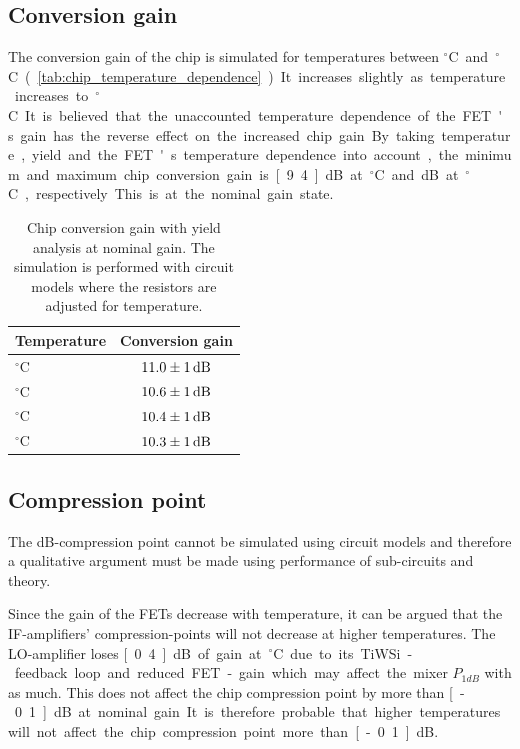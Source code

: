 		\subsection{Conversion gain}
			The conversion gain of the chip is simulated for temperatures between \unit[-40]{$^\circ$C} and \unit[85]{$^\circ$C} (\autoref{tab:chip_temperature_dependence}). It increases slightly as temperature increases to \unit[85]{$^\circ$C}. It is believed that the unaccounted temperature dependence of the FET's gain has the reverse effect on the increased chip gain.
			
			By taking temperature, yield and the FET's temperature dependence into account, the minimum and maximum chip conversion gain is \unit[9.4]{dB} at \unit[55]{$^\circ$C} and \unit[12]{dB} at \unit[-40]{$^\circ$C}, respectively. This is at the nominal gain state.

			\begin{table}[h!]
				\caption[Chip conversion gain temperature dependence]{Chip conversion gain with yield analysis at nominal gain. The simulation is performed with circuit models where the resistors are adjusted for temperature.}
				\label{tab:chip_temperature_dependence}
				\centering
				\begin{tabular}{ l c } \toprule %
					Temperature & Conversion gain \\\midrule
					\unit[-40]{$^\circ$C} 	& $\unit[11.0\pm1]{dB}$\\
					\unit[20]{$^\circ$C} 	& $\unit[10.6\pm1]{dB}$\\
					\unit[55]{$^\circ$C} 	& $\unit[10.4\pm1]{dB}$ \\
					\unit[85]{$^\circ$C}	& $\unit[10.3\pm1]{dB}$ \\\bottomrule
				\end{tabular}
			\end{table}			
	

		\subsection{Compression point}
			The \unit[1]{dB}-compression point cannot be simulated using circuit models and therefore a qualitative argument must be made using performance of sub-circuits and theory.
		
			Since the gain of the FETs decrease with temperature, it can be argued that the IF-amplifiers' compression-points will not decrease at higher temperatures. The LO-amplifier loses \unit[0.4]{dB} of gain at \unit[55]{$^\circ$C} due to its TiWSi-feedback loop and reduced FET-gain which may affect the mixer $P_{1dB}$ with as much. This does not affect the chip compression point by more than \unit[-0.1]{dB} at nominal gain. It is therefore probable that higher temperatures will not affect the chip compression point more than \unit[-0.1]{dB}. 
		
